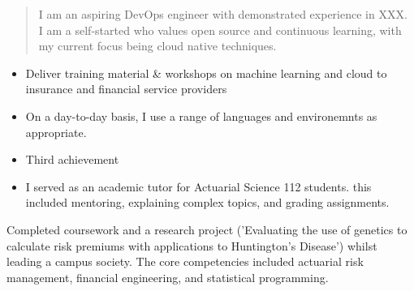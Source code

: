 \documentclass[10pt,a4paper,ragged2e,withhyper]{altacv}
\begin{document}
\begin{paracol}{2}
        \switchcolumn
        
            \begin{quote}
                I am an aspiring DevOps engineer with demonstrated experience in XXX.\\

		I am a self-started who values open source and continuous learning, with my current focus being cloud native techniques.
            \end{quote}
        
            \begin{itemize}
	      \item Deliver training material \& workshops on machine learning and cloud to insurance and financial service providers
	      \item On a day-to-day basis, I use a range of languages and environemnts as appropriate. 
              \item Third achievement
            \end{itemize}
        
            \divider
            \begin{itemize}
	      \item I served as an academic tutor for Actuarial Science 112 students. this included mentoring, explaining complex topics, and grading assignments. 
            \end{itemize}
            
        
	    Completed coursework and a research project ('Evaluating the use of genetics to calculate risk premiums with applications to Huntington's Disease') whilst leading a campus society. The core competencies included actuarial risk management, financial engineering, and statistical programming.

            \divider
            

\end{paracol}
\end{document}
